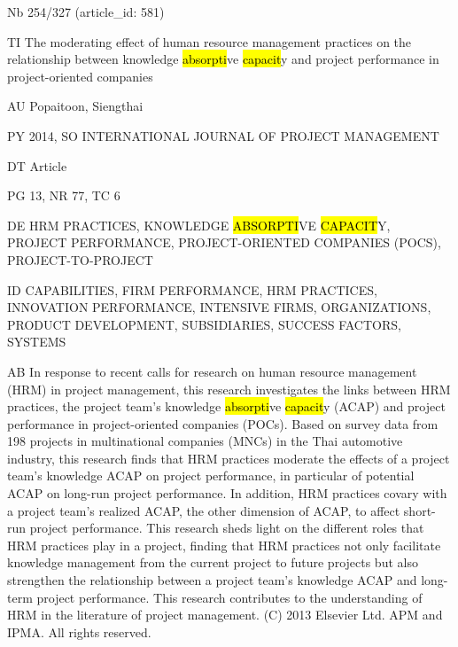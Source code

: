 \documentclass[a4paper]{article}
\begin{document}
\vspace*{-2cm}
Nb \tabto{0cm}254/327 (article\_id: 581)\par
TI \tabto{0cm}The moderating effect of human resource management practices on the relationship between knowledge \hl{absorpti}ve \hl{capacit}y and project performance in project-oriented companies\par
AU \tabto{0cm}Popaitoon, Siengthai\par
PY \tabto{0cm}2014, SO INTERNATIONAL JOURNAL OF PROJECT MANAGEMENT\par
DT \tabto{0cm}Article\par
PG \tabto{0cm}13, NR 77, TC 6\par
DE \tabto{0cm}HRM PRACTICES, KNOWLEDGE \hl{ABSORPTI}VE \hl{CAPACIT}Y, PROJECT PERFORMANCE, PROJECT-ORIENTED COMPANIES (POCS), PROJECT-TO-PROJECT\par
ID \tabto{0cm}CAPABILITIES, FIRM PERFORMANCE, HRM PRACTICES, INNOVATION PERFORMANCE, INTENSIVE FIRMS, ORGANIZATIONS, PRODUCT DEVELOPMENT, SUBSIDIARIES, SUCCESS FACTORS, SYSTEMS\par
AB \tabto{0cm}In response to recent calls for research on human resource management (HRM) in project management, this research investigates the links between HRM practices, the project team's knowledge \hl{absorpti}ve \hl{capacit}y (ACAP) and project performance in project-oriented companies (POCs). Based on survey data from 198 projects in multinational companies (MNCs) in the Thai automotive industry, this research finds that HRM practices moderate the effects of a project team's knowledge ACAP on project performance, in particular of potential ACAP on long-run project performance. In addition, HRM practices covary with a project team's realized ACAP, the other dimension of ACAP, to affect short-run project performance. This research sheds light on the different roles that HRM practices play in a project, finding that HRM practices not only facilitate knowledge management from the current project to future projects but also strengthen the relationship between a project team's knowledge ACAP and long-term project performance. This research contributes to the understanding of HRM in the literature of project management. (C) 2013 Elsevier Ltd. APM and IPMA. All rights reserved.\par
\clearpage
\end{document}
